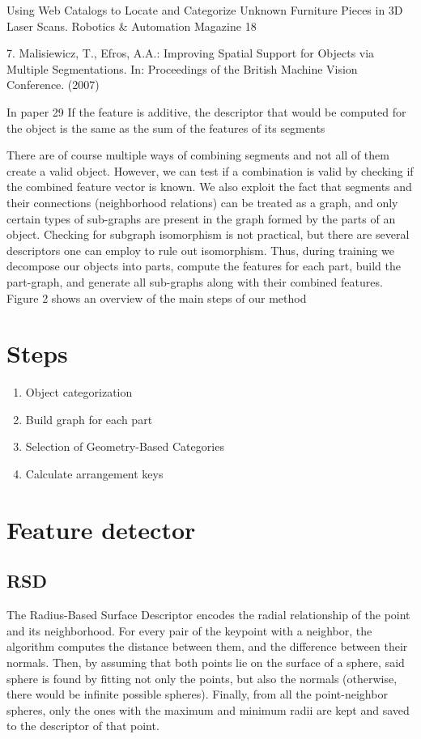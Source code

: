 \documentclass[runningheads,a4paper]{llncs}
\begin{document}
{ Using Web Catalogs to Locate and Categorize Unknown Furniture Pieces in 3D
Laser Scans.  Robotics & Automation Magazine
18

7.  Malisiewicz, T., Efros, A.A.:  Improving Spatial Support for Objects via Multiple
Segmentations.  In: Proceedings of the British Machine Vision Conference. (2007)


In paper 29
If the feature is additive, the descriptor that would be computed for the object is
the same as the sum of the features of its segments

There are of course multiple ways of combining segments and not all of them
create a valid object. However, we can test if a combination is valid by checking if
the combined feature vector is known. We also exploit the fact that segments and
their connections (neighborhood relations) can be treated as a graph, and only
certain types of sub-graphs are present in the graph formed by the parts of an
object. Checking for subgraph isomorphism is not practical, but there are several
descriptors one can employ to rule out isomorphism. Thus, during training we
decompose  our  objects  into  parts,  compute  the  features  for  each  part,  build
the part-graph, and generate all sub-graphs along with their combined features.
Figure 2 shows an overview of the main steps of our method

\section{Steps}
\begin{enumerate}
    \item Object categorization
    \item Build graph for each part
    \item Selection of Geometry-Based Categories
    \item Calculate arrangement keys
\end{enumerate}

\section{Feature detector}


\subsection{RSD}
The Radius-Based Surface Descriptor encodes the radial relationship of the point and its neighborhood. For every pair of the keypoint with a neighbor, the algorithm computes the distance between them, and the difference between their normals. Then, by assuming that both points lie on the surface of a sphere, said sphere is found by fitting not only the points, but also the normals (otherwise, there would be infinite possible spheres). Finally, from all the point-neighbor spheres, only the ones with the maximum and minimum radii are kept and saved to the descriptor of that point.

}
\end{document}
